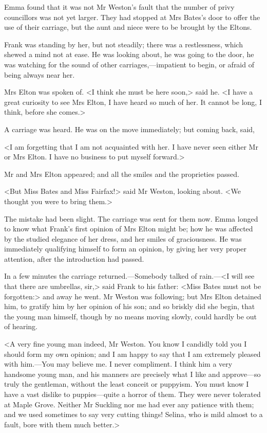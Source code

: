 Emma found that it was not Mr Weston's fault that the number of privy councillors was not yet larger. They had stopped at Mrs Bates's door to offer the use of their carriage, but the aunt and niece were to be brought by the Eltons.

Frank was standing by her, but not steadily; there was a restlessness, which shewed a mind not at ease. He was looking about, he was going to the door, he was watching for the sound of other carriages,—impatient to begin, or afraid of being always near her.

Mrs Elton was spoken of. <I think she must be here soon,> said he. <I have a great curiosity to see Mrs Elton, I have heard so much of her. It cannot be long, I think, before she comes.>

A carriage was heard. He was on the move immediately; but coming back, said,

<I am forgetting that I am not acquainted with her. I have never seen either Mr or Mrs Elton. I have no business to put myself forward.>

Mr and Mrs Elton appeared; and all the smiles and the proprieties passed.

<But Miss Bates and Miss Fairfax!> said Mr Weston, looking about. <We thought you were to bring them.>

The mistake had been slight. The carriage was sent for them now. Emma longed to know what Frank's first opinion of Mrs Elton might be; how he was affected by the studied elegance of her dress, and her smiles of graciousness. He was immediately qualifying himself to form an opinion, by giving her very proper attention, after the introduction had passed.

In a few minutes the carriage returned.—Somebody talked of rain.—<I will see that there are umbrellas, sir,> said Frank to his father: <Miss Bates must not be forgotten:> and away he went. Mr Weston was following; but Mrs Elton detained him, to gratify him by her opinion of his son; and so briskly did she begin, that the young man himself, though by no means moving slowly, could hardly be out of hearing.

<A very fine young man indeed, Mr Weston. You know I candidly told you I should form my own opinion; and I am happy to say that I am extremely pleased with him.—You may believe me. I never compliment. I think him a very handsome young man, and his manners are precisely what I like and approve—so truly the gentleman, without the least conceit or puppyism. You must know I have a vast dislike to puppies—quite a horror of them. They were never tolerated at Maple Grove. Neither Mr Suckling nor me had ever any patience with them; and we used sometimes to say very cutting things! Selina, who is mild almost to a fault, bore with them much better.>

